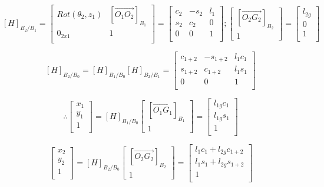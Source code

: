 \documentclass[12pt,a4paper]{article}
\begin{document}
\begin{itemize}
\begin{itemize}
	$$ [H]_{B_2/B_1} =
	\begin{bmatrix}
	 Rot(\theta_2, z_1) & [\overrightarrow{O_1 O_2}]_{B_1} \\
	 0_{2x1} & 1 \\
	\end{bmatrix}
	=
	\begin{bmatrix}
	 c_2 & -s_2 & l_1 \\
	 s_2 & c_2 & 0 \\
	 0 & 0 & 1 \\
	\end{bmatrix} ;
	\begin{bmatrix}
	[\overrightarrow{O_2 G_2}]_{B_2} \\
	1
	\end{bmatrix}
	=
	\begin{bmatrix}
	l_{2g} \\
	0 \\
	1 \\
	\end{bmatrix}
	$$

	$$
	[H]_{B_2/B_0} = [H]_{B_1/B_0} [H]_{B_2/B_1} =
	\begin{bmatrix}
	c_{1+2} & -s_{1+2} & l_1 c_1 \\
	s_{1+2} & c_{1+2} & l_1 s_1 \\
	0 & 0 & 1 \\
	\end{bmatrix}
	$$


	\begin{equation}
	\therefore \begin{bmatrix}
	x_1 \\
	y_1 \\
	1 \\
	\end{bmatrix}
	=
	[H]_{B_1/B_0}
	\begin{bmatrix}
	[\overrightarrow{O_1 G_1}]_{B_1} \\
	1
	\end{bmatrix}
	=
	\begin{bmatrix}
	 l_{1g} c_1 \\
	 l_{1g} s_1 \\
	 1 \\
	\end{bmatrix}
	\end{equation}

	\begin{equation}
	\begin{bmatrix}
	x_2 \\
	y_2 \\
	1 \\
	\end{bmatrix}
	=
	[H]_{B_2/B_0}
	\begin{bmatrix}
	[\overrightarrow{O_2 G_2}]_{B_2} \\
	1
	\end{bmatrix}
	=
	\begin{bmatrix}
	 l_1 c_1 + l_{2g} c_{1+2} \\
	 l_1 s_1 + l_{2g} s_{1+2} \\
	 1 \\
	\end{bmatrix}
	\end{equation}


\end{itemize}
\end{itemize}
\end{document}
